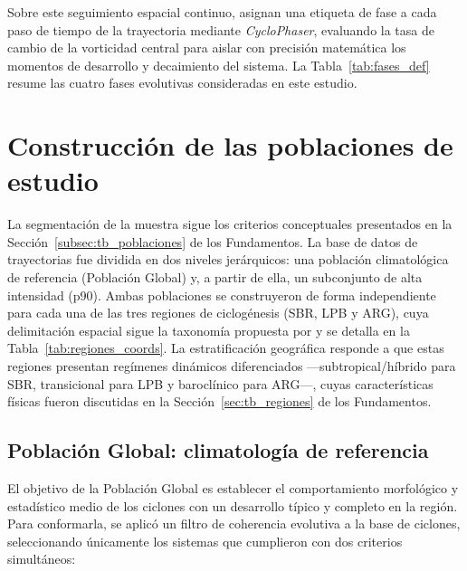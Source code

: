 Sobre este seguimiento espacial continuo, \citet{coutodesouza2024new} asignan una etiqueta de fase a cada paso de tiempo de la trayectoria mediante \textit{CycloPhaser}, evaluando la tasa de cambio de la vorticidad central para aislar con precisión matemática los momentos de desarrollo y decaimiento del sistema. La Tabla~\ref{tab:fases_def} resume las cuatro fases evolutivas consideradas en este estudio.




\section{Construcción de las poblaciones de estudio}\label{sec:poblaciones_estudio}

La segmentación de la muestra sigue los criterios conceptuales presentados en la Sección~\ref{subsec:tb_poblaciones} de los Fundamentos. La base de datos de trayectorias fue dividida en dos niveles jerárquicos: una población climatológica de referencia (Población Global) y, a partir de ella, un subconjunto de alta intensidad (p90). Ambas poblaciones se construyeron de forma independiente para cada una de las tres regiones de ciclogénesis (SBR, LPB y ARG), cuya delimitación espacial sigue la taxonomía propuesta por \citet{gramcianinov2019properties} y se detalla en la Tabla~\ref{tab:regiones_coords}. La estratificación geográfica responde a que estas regiones presentan regímenes dinámicos diferenciados —subtropical/híbrido para SBR, transicional para LPB y baroclínico para ARG—, cuyas características físicas fueron discutidas en la Sección~\ref{sec:tb_regiones} de los Fundamentos.



\subsection{Población Global: climatología de referencia}\label{subsec:grupo_global}

El objetivo de la Población Global es establecer el comportamiento morfológico y estadístico medio de los ciclones con un desarrollo típico y completo en la región. Para conformarla, se aplicó un filtro de coherencia evolutiva a la base de ciclones, seleccionando únicamente los sistemas que cumplieron con dos criterios simultáneos:

